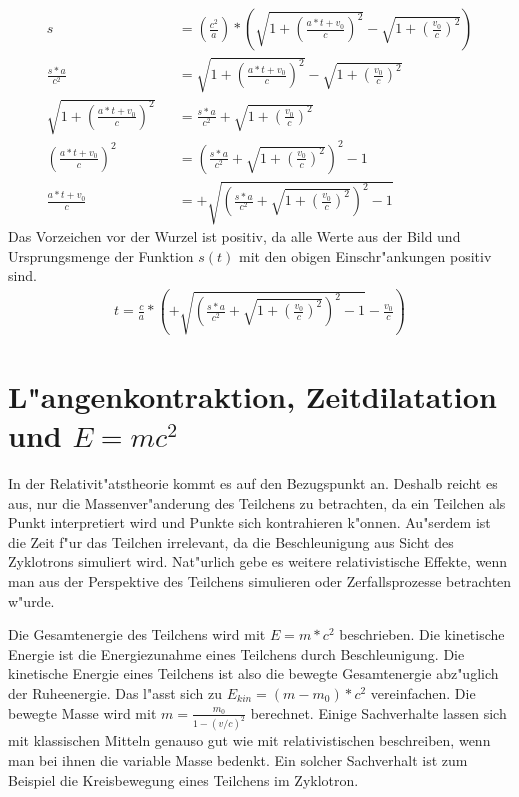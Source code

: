 \documentclass[14pt, a4paper]{report}
\begin{document}
\begin{eqnarray}
s && = \left(\frac{c^2}{a}\right) * \left(\sqrt{1 + \left(\frac{a*t + v_0}{c}\right)^2} - \sqrt{1 + \left(\frac{v_0}{c}\right)^2}\right) \\
\frac{s*a}{c^2}&& = \sqrt{1 + \left(\frac{a*t + v_0}{c}\right)^2} - \sqrt{1 + \left(\frac{v_0}{c}\right)^2}\\
\sqrt{1 + \left(\frac{a*t + v_0}{c}\right)^2} &&= \frac{s*a}{c^2} + \sqrt{1 + \left(\frac{v_0}{c}\right)^2} \\
\left(\frac{a*t + v_0}{c}\right)^2 &&  = \left(\frac{s*a}{c^2} + \sqrt{1 + \left(\frac{v_0}{c}\right)^2}\right)^2 - 1 \\ 
\frac{a*t + v_0}{c} && = +\sqrt{\left(\frac{s*a}{c^2} + \sqrt{1 + \left(\frac{v_0}{c}\right)^2}\right)^2 - 1}
\end{eqnarray}
Das Vorzeichen vor der Wurzel ist positiv, da alle Werte aus der Bild und Ursprungsmenge 
der Funktion $s(t)$ mit den obigen Einschr"ankungen positiv sind.
\begin{eqnarray}
t = \frac{c}{a} * \left( +\sqrt{\left(\frac{s*a}{c^2} + \sqrt{1 + \left(\frac{v_0}{c}\right)^2}\right)^2 - 1} - \frac{v_0}{c}\right)
\end{eqnarray}

\section{L"angenkontraktion, Zeitdilatation und $E=mc^2$}
In der Relativit"atstheorie kommt es auf den Bezugspunkt an. Deshalb reicht es aus, nur
die Massenver"anderung des Teilchens zu betrachten, da ein Teilchen als Punkt 
interpretiert wird und Punkte sich kontrahieren k"onnen. Au"serdem ist die Zeit f"ur das 
Teilchen irrelevant, da die Beschleunigung aus Sicht des Zyklotrons simuliert wird.
Nat"urlich gebe es weitere relativistische Effekte, wenn man aus der Perspektive des 
Teilchens simulieren oder Zerfallsprozesse betrachten w"urde.

Die Gesamtenergie des Teilchens wird mit $E = m*c^2$  beschrieben. Die kinetische Energie ist die 
Energiezunahme eines Teilchens durch Beschleunigung. Die kinetische Energie eines
Teilchens ist also die bewegte Gesamtenergie abz"uglich der Ruheenergie. Das l"asst sich zu 
$E_{kin} = (m-m_0)*c^2$ vereinfachen. Die bewegte Masse wird mit 
$m = \frac{m_0}{1-(v/c)^2}$ berechnet.
Einige Sachverhalte lassen sich mit klassischen Mitteln genauso gut wie mit 
relativistischen beschreiben, wenn man bei ihnen die variable Masse bedenkt. Ein solcher
Sachverhalt ist zum Beispiel die Kreisbewegung eines Teilchens im Zyklotron.
\end{document}
